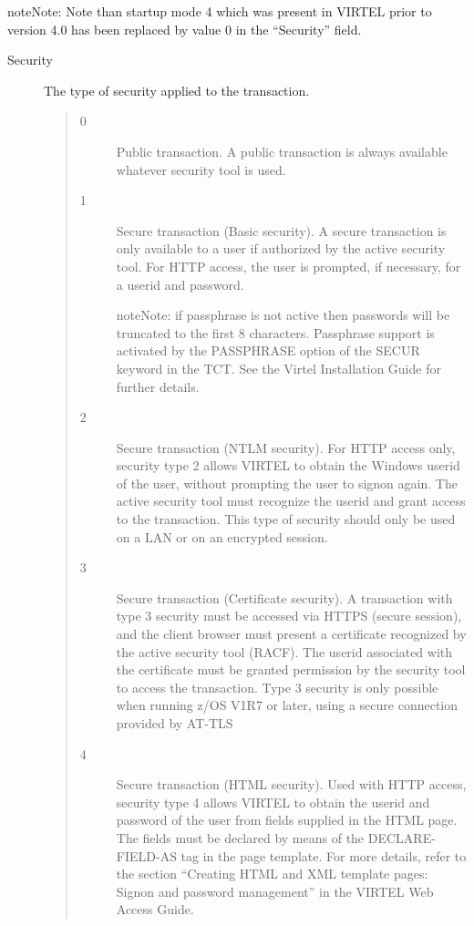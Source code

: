\documentclass[letterpaper,10pt,english]{sphinxmanual}
\begin{document}
\begin{sphinxadmonition}{note}{Note:}
Note than startup mode 4 which was present in VIRTEL prior to version 4.0 has been replaced by value 0 in the “Security” field.
\end{sphinxadmonition}
\begin{description}
\item[{Security}] \leavevmode
The type of security applied to the transaction.
\begin{quote}
\begin{description}
\item[{0}] \leavevmode
Public transaction. A public transaction is always available whatever security tool is used.

\item[{1}] \leavevmode
Secure transaction (Basic security). A secure transaction is only available to a user if authorized by the active security tool. For HTTP access, the user is prompted, if necessary, for a userid and password.

\begin{sphinxadmonition}{note}{Note:}
if passphrase is not active then passwords will be truncated to the first 8 characters. Passphrase support is activated by the PASSPHRASE option of the SECUR keyword in the TCT. See the Virtel Installation Guide for further details.
\end{sphinxadmonition}

\item[{2}] \leavevmode
Secure transaction (NTLM security). For HTTP access only, security type 2 allows VIRTEL to obtain the Windows userid of the user, without prompting the user to signon again. The active security tool must recognize the userid and grant access to the transaction. This type of security should only be used on a LAN or on an encrypted session.

\item[{3}] \leavevmode
Secure transaction (Certificate security). A transaction with type 3 security must be accessed via HTTPS (secure session), and the client browser must present a certificate recognized by the active security tool (RACF). The userid associated with the certificate must be granted permission by the security tool to access the transaction. Type 3 security is only possible when running z/OS V1R7 or later, using a secure connection provided by AT-TLS

\item[{4}] \leavevmode
Secure transaction (HTML security). Used with HTTP access, security type 4 allows VIRTEL to obtain the userid and password of the user from fields supplied in the HTML page. The fields must be declared by means of the DECLARE-FIELD-AS tag in the page template. For more details, refer to the section “Creating HTML and XML template pages: Signon and password management” in the VIRTEL Web Access Guide.


\end{description}
\end{quote}
\end{description}
\end{document}

